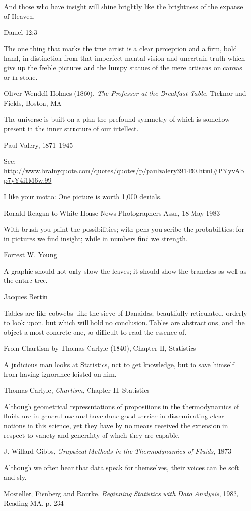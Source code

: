 \epigraph{And those who have insight will shine brightly like the brightness of the expanse of Heaven.}{Daniel 12:3}

\epigraph{The one thing that marks the true artist is a clear perception and a firm, bold hand, in distinction from that imperfect mental vision and uncertain truth which give up the feeble pictures and the lumpy statues of the mere artisans on canvas or in stone.}{Oliver Wendell Holmes (1860), \emph{The Professor at the Breakfast Table}, Ticknor and Fields, Boston, MA}

\epigraph{The universe is built on a plan the profound symmetry of which is somehow present in the inner structure of our intellect.} {Paul Valery, 1871--1945}

See: \url{http://www.brainyquote.com/quotes/quotes/p/paulvalery391460.html#PYyvAbp7yY4i1M6w.99}

\epigraph{I like your motto: One picture is worth 1,000 denials.}{Ronald Reagan to White House News Photographers Assn, 18 May 1983}

\epigraph{With brush you paint the possibilities; with pens you scribe the probabilities; for in pictures we find insight; while in numbers find we strength.}{Forrest W. Young}

\epigraph{A graphic should not only show the leaves; it should show the branches as well as the entire tree.}{Jacques Bertin \cite[preface]{Bertin:83}}

\epigraph{Tables are like cobwebs, like the sieve of Danaides; beautifully reticulated, orderly to look upon, but which will hold no conclusion. Tables are abstractions, and the object a most concrete one, so difficult to read the essence of.}{From Chartism by Thomas Carlyle (1840), Chapter II, Statistics}

\epigraph{A judicious man looks at Statistics, not to get knowledge, but to save himself from having ignorance foisted on him.}{Thomas Carlyle, \emph{Chartism}, Chapter II, Statistics}

\epigraph{Although geometrical representations of propositions in the thermodynamics of fluids are in general use and have done good service in disseminating clear notions in this science, yet they have by no means received the extension in respect to variety and generality of which they are capable.}{J. Willard Gibbs, \emph{Graphical Methods in the Thermodynamics of Fluids}, 1873 \citeyear{Gibbs:1873a}}

\epigraph{Although we often hear that data speak for themselves, their voices can be soft and sly.}{Mosteller, Fienberg and Rourke, \emph{Beginning Statistics with Data Analysis}, 1983, Reading MA, p. 234}

